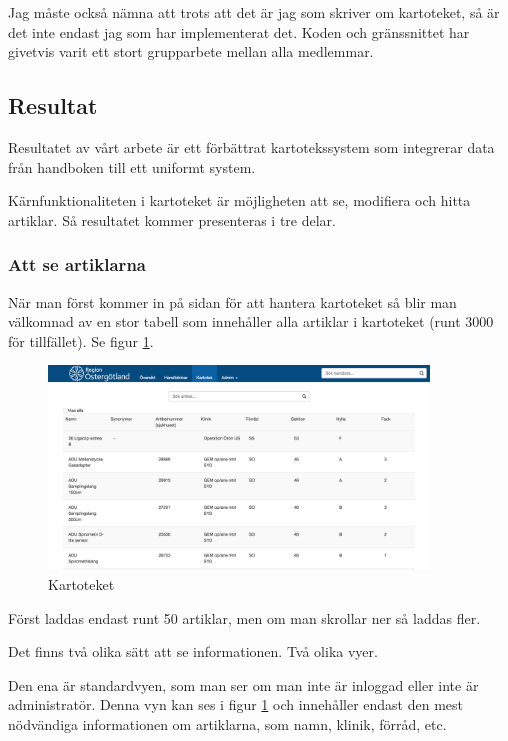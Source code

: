 Jag måste också nämna att trots att det är jag som skriver om kartoteket,
så är det inte endast jag som har implementerat det. Koden och gränssnittet har givetvis
varit ett stort grupparbete mellan alla medlemmar.


\clearpage
\subsection{Resultat}
Resultatet av vårt arbete är ett förbättrat kartotekssystem
som integrerar data från handboken till ett uniformt system.

Kärnfunktionaliteten i kartoteket är möjligheten att se, modifiera och hitta artiklar.
Så resultatet kommer presenteras i tre delar.

\subsubsection{Att se artiklarna}
När man först kommer in på sidan för att hantera kartoteket så
blir man välkomnad av en stor tabell som innehåller alla artiklar
i kartoteket (runt 3000 för tillfället). Se figur \ref{fig:table}.

\begin{figure}[h!]
  \centering
  \includegraphics[width=0.9\textwidth]{../images/kartotek1.png}
  \caption{Kartoteket}
  \label{fig:table}
\end{figure}

Först laddas endast runt 50 artiklar, men
om man skrollar ner så laddas fler.

Det finns två olika sätt att se informationen.
Två olika vyer.

Den ena är standardvyen, som man ser om man inte är inloggad
eller inte är administratör. Denna vyn kan ses i figur \ref{fig:table}
och innehåller endast den mest nödvändiga informationen om
artiklarna, som namn, klinik, förråd, etc.


